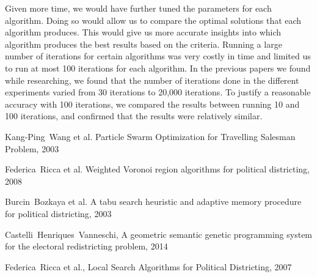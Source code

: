 \documentclass[journal]{IEEEtran}
\begin{document}
Given more time, we would have further tuned the parameters for each algorithm. Doing so would allow us to compare the optimal solutions that each algorithm produces. This would give us more accurate insights into which algorithm produces the best results based on the criteria. Running a large number of iterations for certain algorithms was very costly in time and limited us to run at most 100 iterations for each algorithm. In the previous papers we found while researching, we found that the number of iterations done in the different experiments varied from 30 iterations\cite{local-search-2} to 20,000 iterations\cite{geometric-ga}. To justify a reasonable accuracy with 100 iterations, we compared the results between running 10 and 100 iterations, and confirmed that the results were relatively similar. 


\begin{thebibliography}{1}

Kang-Ping~Wang et al. Particle Swarm Optimization for Travelling Salesman
        Problem, 2003

Federica~Ricca et al. Weighted Voronoi region algorithms for political
        districting, 2008

    Burcin~Bozkaya et al.  A tabu search heuristic and adaptive memory procedure
        for political districting, 2003

    Castelli~Henriques~Vanneschi, A geometric semantic genetic programming system for the electoral redistricting problem, 2014

    Federica~Ricca et al., Local Search Algorithms for Political Districting, 2007

\end{thebibliography}
\end{document}
